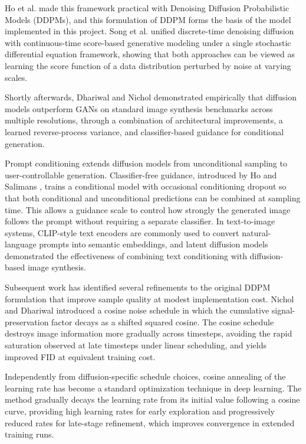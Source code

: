 \documentclass[conference]{IEEEtran}
\begin{document}
Ho et al. \cite{b4} made this framework practical with Denoising Diffusion Probabilistic Models (DDPMs), and this formulation of DDPM forms the basis of the model implemented in this project. Song et al. \cite{b5} unified discrete-time denoising diffusion with continuous-time score-based generative modeling under a single stochastic differential equation framework, showing that both approaches can be viewed as learning the score function of a data distribution perturbed by noise at varying scales.

Shortly afterwards, Dhariwal and Nichol \cite{b6} demonstrated empirically that diffusion models outperform GANs on standard image synthesis benchmarks across multiple resolutions, through a combination of architectural improvements, a learned reverse-process variance, and classifier-based guidance for conditional generation.

Prompt conditioning extends diffusion models from unconditional sampling to user-controllable generation. Classifier-free guidance, introduced by Ho and Salimans \cite{b7}, trains a conditional model with occasional conditioning dropout so that both conditional and unconditional predictions can be combined at sampling time. This allows a guidance scale to control how strongly the generated image follows the prompt without requiring a separate classifier. In text-to-image systems, CLIP-style text encoders \cite{b8} are commonly used to convert natural-language prompts into semantic embeddings, and latent diffusion models \cite{b9} demonstrated the effectiveness of combining text conditioning with diffusion-based image synthesis.

Subsequent work has identified several refinements to the original DDPM formulation that improve sample quality at modest implementation cost. Nichol and Dhariwal \cite{b10} introduced a cosine noise schedule in which the cumulative signal-preservation factor decays as a shifted squared cosine. The cosine schedule destroys image information more gradually across timesteps, avoiding the rapid saturation observed at late timesteps under linear scheduling, and yields improved FID at equivalent training cost.

Independently from diffusion-specific schedule choices, cosine annealing of the learning rate \cite{b11} has become a standard optimization technique in deep learning. The method gradually decays the learning rate from its initial value following a cosine curve, providing high learning rates for early exploration and progressively reduced rates for late-stage refinement, which improves convergence in extended training runs.
\end{document}
